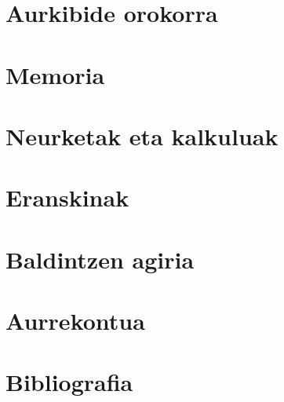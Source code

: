 \documentclass[a4paper,titlepage,10pt,oneside]{report}
\begin{document}
\DOpresetDOtitlepg

\chapter{Aurkibide orokorra} \DOtls
\chapter{Memoria}
\pagestyle{empty}\pagestyle{body}
\DOmtls{\DOmtoc\DOmlof\DOmlot\DOmlos}


\label{lic}



\chapter{Neurketak eta kalkuluak} \DOmtls{\DOmtoc}

\chapter{Eranskinak} \DOmtls{\DOmtoc}
\attref
{}
\ordref

\chapter{Baldintzen agiria} \DOmtls{\DOmtoc}

\chapter{Aurrekontua}

\nocite{*}
\chapter{Bibliografia}

\fancyhead[L]{\slshape \nouppercase{\bibname}}

\end{document}
